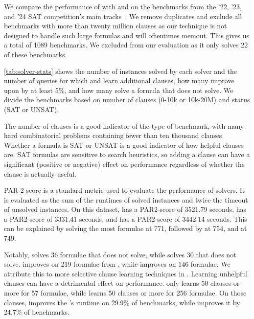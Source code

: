 We compare the performance of \tool with \cadical and \prelearn on the
benchmarks from the '22, '23, and '24 SAT competition's main
tracks~\cite{satcomp2022,satcomp2023,satcomp2024}. We remove duplicates and
exclude all benchmarks with more than twenty million clauses as our technique
is not designed to handle such large formulas and will oftentimes memout. This gives us a
total of 1089 benchmarks. We excluded \sadical from our evaluation as it 
only solves 22 of these benchmarks.

\autoref{tab:solver-stats} shows the number of instances solved by each solver
and the number of queries for which \prelearn and \cadical learn additional \pr
clauses, how many improve upon \cadical by at least 5\%, and how many solve a
formula that \cadical does not solve. We divide the benchmarks based on number
of clauses (0-10k or 10k-20M) and status (SAT or UNSAT). 

The number of clauses 
is a good indicator of the type of benchmark, with many hard combinatorial problems containing fewer than ten thousand clauses. %
Whether a formula is SAT or UNSAT is a good indicator 
of how helpful \pr clauses are. SAT formulas are sensitive to search heuristics, so 
adding a \pr clause can have a significant (positive or negative) effect on performance
regardless of whether the clause is actually useful.

PAR-2 score is a standard metric used to evaluate the performance of solvers. It
is evaluated as the sum of the runtimes of solved instances and twice the
timeout of unsolved instances. On this dataset, \cadical has a PAR2-score of
3521.79 seconds, \prelearn has a PAR2-score of 3331.41 seconds, and \tool has a
PAR2-score of 3442.14 seconds. This can be explained by \prelearn solving the
most formulae at 771, followed by \tool at 754, and \cadical at 749.

Notably, \tool solves 36 formulae that \cadical does not solve, while \prelearn
solves 30 that \cadical does not solve. \tool improves on 219 formulae from
\cadical, while \prelearn improves on 146 formulae. We attribute this to more
selective \pr clause learning techniques in \tool. Learning unhelpful \pr
clauses can have a detrimental effect on performance. \tool only learns 50 \pr
clauses or more for 57 formulae, while \prelearn learns 50 \pr clauses or more
for 256 formulae. On those clauses, \tool improves the \cadical's runtime on
29.9\% of benchmarks, while \prelearn improves it by 24.7\% of benchmarks.

